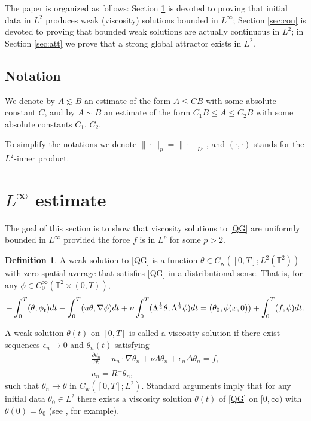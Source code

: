 \documentclass{amsart}
\numberwithin{Theorem}{section}
\theoremstyle{definition}
\newtheorem{Definition}[Theorem]{Definition}
\theoremstyle{remark}
\newcommand{\e}{\epsilon}
\renewcommand{\th}{\theta}
\begin{document}
The paper is organized as follows: Section \ref{sec:infty} is devoted to proving that initial data in $L^2$ produces weak (viscosity) solutions bounded in $L^\infty$; Section \ref{sec:con} is devoted to proving that bounded weak solutions are actually continuous in $L^2$; in Section \ref{sec:att} we prove that a strong global attractor exists in $L^2$. 


\subsection{Notation}
\label{sec:notation}
We denote by $A\lesssim B$ an estimate of the form $A\leq C B$ with
some absolute constant $C$, and by $A\sim B$ an estimate of the form $C_1
B\leq A\leq C_2 B$ with some absolute constants $C_1$, $C_2$.

To simplify the notations we denote $\|\cdot\|_p=\|\cdot\|_{L^p}$, and $(\cdot, \cdot)$ stands for the $L^2$-inner product.

\section{$L^\infty$ estimate}
\label{sec:infty}

The goal of this section is to show that viscosity solutions to \eqref{QG} are uniformly bounded in  $L^\infty$ provided the force $f$ is in $L^p$ for some $p>2$.

\begin{Definition}
A weak solution to \eqref{QG} is a function $\th \in C_{\mathrm{w}}([0,T];L^2(\mathbb{T}^2))$ with zero spatial average that satisfies \eqref{QG} in a distributional sense.
That is, for any $\phi\in C_0^\infty(\mathbb T^2\times(0,T))$,
\begin{equation}\notag
-\int_0^T(\theta, \phi_t)dt-\int_0^T(u\theta, \nabla\phi)dt+\nu\int_0^T(\Lambda^{\frac{1}{2}}\theta, \Lambda^{\frac{1}{2}}\phi)dt
=(\theta_0, \phi(x,0))+\int_0^T(f, \phi)dt.
\end{equation}
\end{Definition}

A weak solution $\th(t)$ on $[0,T]$ is called a viscosity solution if there exist sequences $\e_n \to 0$ and $\th_n(t)$ satisfying
\begin{equation}\begin{split}\label{VQG}
\frac{\partial\theta_n}{\partial t}+u_n\cdot\nabla \theta_n+\nu\Lambda\theta_n + \e_n \Delta \th_n=f,\\
u_n=R^\perp\theta_n,
\end{split}
\end{equation}
such that $\th_n \to \theta$ in $C_\mathrm{w}([0,T];L^2)$. Standard arguments imply that for any initial data $\th_0 \in L^2$ there exists a viscosity solution $\th(t)$ of \eqref{QG} on $[0,\infty)$ with $\th(0)=\th_0$ (see \cite{CC}, for example).
\end{document}
